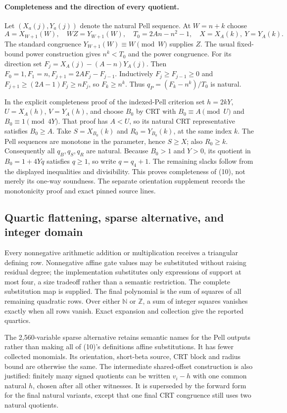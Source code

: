 \documentclass[11pt]{article}
\begin{document}
\paragraph{Completeness and the direction of every quotient.}
Let $(X_a(j),Y_a(j))$ denote the natural Pell sequence.  At $W=n+k$ choose
\[
 A=X_{W+1}(W),\quad WZ=Y_{W+1}(W),\quad
 T_0=2An-n^2-1,\quad X=X_A(k),\ Y=Y_A(k).
\]
The standard congruence $Y_{W+1}(W)\equiv W\pmod W$ supplies $Z$.
The usual fixed-bound power construction gives $n^k<T_0$ and the power
congruence.  For its direction set
$F_j=X_A(j)-(A-n)Y_A(j)$.  Then
$F_0=1,F_1=n,F_{j+1}=2AF_j-F_{j-1}$.  Inductively
$F_j\ge F_{j-1}\ge0$ and
$F_{j+1}\ge(2A-1)F_j\ge nF_j$, so $F_k\ge n^k$.
Thus $q_P=(F_k-n^k)/T_0$ is natural.

In the explicit completeness proof of the indexed-Pell criterion set
$h=2kY$, $U=X_A(h)$, $V=Y_A(h)$, and choose $B_0$ by CRT with
$B_0\equiv A\pmod U$ and $B_0\equiv1\pmod{4Y}$.
That proof has $A<U$, so its natural CRT representative satisfies
$B_0\ge A$.  Take $S=X_{B_0}(k)$ and $R_0=Y_{B_0}(k)$, at the same
index $k$.  The Pell sequences are monotone in the parameter, hence
$S\ge X$; also $R_0\ge k$.  Consequently all $q_B,q_S,q_R$ are natural.
Because $B_0>1$ and $Y>0$, its quotient in $B_0=1+4Yq$ satisfies $q\ge1$,
so write $q=q_4+1$.  The remaining slacks follow from the displayed
inequalities and divisibility.  This proves completeness of (10), not
merely its one-way soundness.  The separate orientation supplement
records the monotonicity proof and exact pinned source lines.

\subsection{Quartic flattening, sparse alternative, and integer domain}

Every nonnegative arithmetic addition or multiplication receives a
triangular defining row.  Nonnegative affine gate values may be
substituted without raising residual degree; the implementation substitutes
only expressions of support at most four, a size tradeoff rather than a
semantic restriction.  The complete substitution map is supplied.
The final polynomial is the sum of squares of all remaining quadratic
rows.  Over either $\mathbb N$ or $\mathbb Z$, a sum of integer squares
vanishes exactly when all rows vanish.  Exact expansion and collection
give the reported quartics.

The 2,560-variable sparse alternative retains semantic names for the Pell
outputs rather than making all of (10)'s definitions affine substitutions.
It has fewer collected monomials.  Its orientation, short-beta source,
CRT block and radius bound are otherwise the same.  The intermediate
shared-offset construction is also justified: finitely many signed
quotients can be written $v_i-h$ with one common natural $h$, chosen after
all other witnesses.  It is superseded by the forward form for the final
natural variants, except that one final CRT congruence still uses two
natural quotients.
\end{document}
